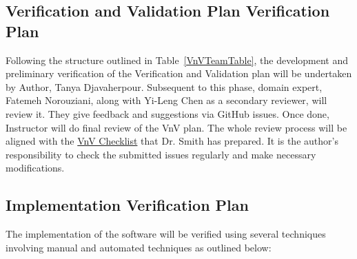 \documentclass[12pt, titlepage]{article}
\begin{document}



\subsection{Verification and Validation Plan Verification Plan}\label{VnvVerPlan}

Following the structure outlined in Table~\ref{VnVTeamTable}, the development and preliminary verification of 
the Verification and Validation plan will be undertaken by Author, Tanya Djavaherpour. 
Subsequent to this phase, domain expert, Fatemeh Norouziani, along with 
Yi-Leng Chen as a secondary reviewer, will review it. 
They give feedback and suggestions via GitHub issues. 
Once done, Instructor will do final review of the VnV plan.
The whole review process will be aligned with the 
\href{https://github.com/smiths/capTemplate/blob/9251702fdcb9800c59f6ed3d11d91e2bd62fca6d/docs/Checklists/VnV-Checklist.pdf}
{VnV Checklist} that Dr. Smith has prepared.
It is the author’s responsibility to check the submitted issues regularly 
and make necessary modifications.




\subsection{Implementation Verification Plan}\label{ImplementationVerPlan}

The implementation of the software will be verified using several techniques
involving manual and automated techniques as outlined below:
\end{document}
